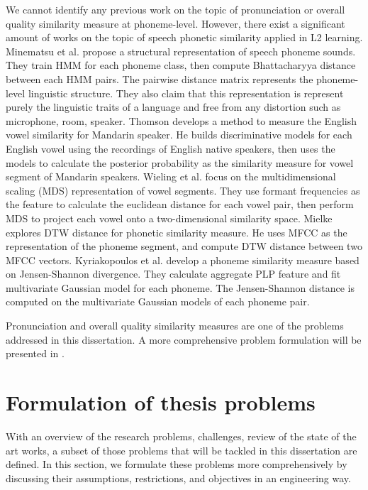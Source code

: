 We cannot identify any previous work on the topic of pronunciation or overall quality similarity measure at phoneme-level. However, there exist a significant amount of works on the topic of speech phonetic similarity applied in L2 learning. Minematsu et al. \cite{Minematsu2004, Minematsu2007, Shiozawa2016} propose a structural representation of speech phoneme sounds. They train HMM for each phoneme class, then compute Bhattacharyya distance between each HMM pairs. The pairwise distance matrix represents the phoneme-level linguistic structure. They also claim that this representation is represent purely the linguistic traits of a language and free from any distortion such as microphone, room, speaker. Thomson \cite{Thomson2008} develops a method to measure the English vowel similarity for Mandarin speaker. He builds discriminative models for each English vowel using the recordings of English native speakers, then uses the models to calculate the posterior probability as the similarity measure for vowel segment of Mandarin speakers. Wieling et al. \cite{Wieling2011} focus on the multidimensional scaling (MDS) representation of vowel segments. They use formant frequencies as the feature to calculate the euclidean distance for each vowel pair, then perform MDS to project each vowel onto a two-dimensional similarity space. Mielke \cite{Mielke2012} explores DTW distance for phonetic similarity measure. He uses MFCC as the representation of the phoneme segment, and compute DTW distance between two MFCC vectors. Kyriakopoulos et al. \cite{Kyriakopoulos2017} develop a phoneme similarity measure based on Jensen-Shannon divergence. They calculate aggregate PLP feature and fit multivariate Gaussian model for each phoneme. The Jensen-Shannon distance is computed on the multivariate Gaussian models of each phoneme pair.

Pronunciation and overall quality similarity measures are one of the problems addressed in this dissertation. A more comprehensive problem formulation will be presented in .

\section{Formulation of thesis problems}\label{sec:ch3:formulation}

With an overview of the research problems, challenges, review of the state of the art works, a subset of those problems that will be tackled in this dissertation are defined. In this section, we formulate these problems more comprehensively by discussing their assumptions, restrictions, and objectives in an engineering way.

